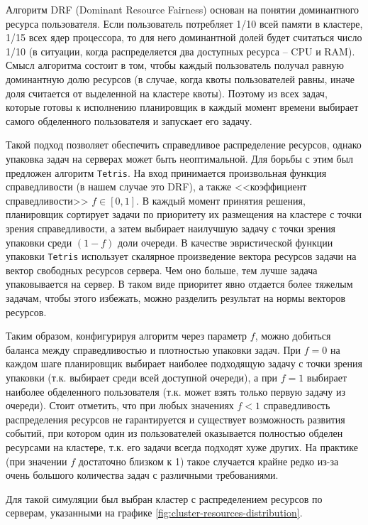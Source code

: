 Алгоритм DRF (Dominant Resource Fairness) основан на понятии доминантного ресурса пользователя. Если пользователь потребляет 1/10 всей памяти в кластере, 1/15 всех ядер процессора, то для него доминантной долей будет считаться число 1/10 (в ситуации, когда распределяется два доступных ресурса -- CPU и RAM). Смысл алгоритма состоит в том, чтобы каждый пользователь получал равную доминантную долю ресурсов (в случае, когда квоты пользователей равны, иначе доля считается от выделенной на кластере квоты). Поэтому из всех задач, которые готовы к исполнению планировщик в каждый момент времени выбирает самого обделенного пользователя и запускает его задачу. 

Такой подход позволяет обеспечить справедливое распределение ресурсов, однако упаковка задач на серверах может быть неоптимальной. Для борьбы с этим был предложен алгоритм \texttt{Tetris}\cite{tetris-article}. На вход принимается произвольная функция справедливости (в нашем случае это DRF), а также <<коэффициент справедливости>> $f \in [0, 1]$. В каждый момент принятия решения, планировщик сортирует задачи по приоритету их размещения на кластере с точки зрения справедливости, а затем выбирает наилучшую задачу с точки зрения упаковки среди $(1 - f)$ доли очереди. В качестве эвристической функции упаковки \texttt{Tetris} использует скалярное произведение вектора ресурсов задачи на вектор свободных ресурсов сервера. Чем оно больше, тем лучше задача упаковывается на сервер. В таком виде приоритет явно отдается более тяжелым задачам, чтобы этого избежать, можно разделить результат на нормы векторов ресурсов. 

Таким образом, конфигурируя алгоритм через параметр $f$, можно добиться баланса между справедливостью и плотностью упаковки задач. При $f = 0$ на каждом шаге планировщик выбирает наиболее подходящую задачу с точки зрения упаковки (т.к. выбирает среди всей доступной очереди), а при $f = 1$ выбирает наиболее обделенного пользователя (т.к. может взять только первую задачу из очереди). Стоит отметить, что при любых значениях $f < 1$ справедливость распределения ресурсов не гарантируется и существует возможность развития событий, при котором один из пользователей оказывается полностью обделен ресурсами на кластере, т.к. его задачи всегда подходят хуже других. На практике (при значении $f$ достаточно близком к 1) такое случается крайне редко из-за очень большого количества задач с различными требованиями. 

Для такой симуляции был выбран кластер с распределением ресурсов по серверам, указанными на графике \ref{fig:cluster-resources-distribution}.

